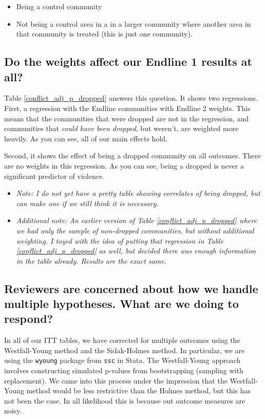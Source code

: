 \documentclass[10pt]{article}
\begin{document}
\begin{itemize}
    \item Being a control community
    \item Not being a control area in a in a larger community where another area in that community is treated (this is just one community). 
\end{itemize}

\subsection*{Do the weights affect our Endline 1 results at all?}

Table \ref{conflict_adj_p_dropped} answers this question. It shows two regressions. First, a regression with the Endline communities with Endline 2 weights. This means that the communities that were dropped are not in the regression, and communities that \textit{could have been dropped}, but weren't, are weighted more heavily. As you can see, all of our main effects hold. 

Second, it shows the effect of being a dropped community on all outcomes. There are no weights in this regression. As you can see, being a dropped is never a significant predictor of violence. 
\begin{itemize}
    \item \textit{Note: I do not yet have a pretty table showing correlates of being dropped, but can make one if we still think it is necessary.} 
    \item \textit{Additional note: An earlier version of Table \ref{conflict_adj_p_dropped} where we had only the sample of non-dropped communities, but without additional weighting. I toyed with the idea of putting that regression in Table \ref{conflict_adj_p_dropped} as well, but decided there was enough information in the table already. Results are the exact same.}
\end{itemize}

\subsection*{Reviewers are concerned about how we handle multiple hypotheses. What are we doing to respond?}
In all of our ITT tables, we have corrected for multiple outcomes using the Westfall-Young method and the Sidak-Holmes method. In particular, we are using the \texttt{wyoung} package from \texttt{ssc} in Stata. The Westfall-Young approach involves constructing simulated p-values from bootstrapping (sampling with replacement). We came into this process under the impression that the Westfall-Young method would be less restrictive than the Holmes method, but this has not been the case. In all likelihood this is because out outcome measures are noisy. 
\end{document}
